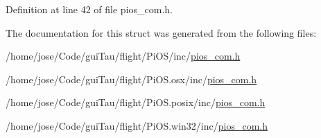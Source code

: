 Definition at line 42 of file pios\-\_\-com.\-h.



The documentation for this struct was generated from the following files\-:\begin{DoxyCompactItemize}
\item 
/home/jose/\-Code/gui\-Tau/flight/\-Pi\-O\-S/inc/\hyperlink{inc_2pios__com_8h}{pios\-\_\-com.\-h}\item 
/home/jose/\-Code/gui\-Tau/flight/\-Pi\-O\-S.\-osx/inc/\hyperlink{osx_2inc_2pios__com_8h}{pios\-\_\-com.\-h}\item 
/home/jose/\-Code/gui\-Tau/flight/\-Pi\-O\-S.\-posix/inc/\hyperlink{posix_2inc_2pios__com_8h}{pios\-\_\-com.\-h}\item 
/home/jose/\-Code/gui\-Tau/flight/\-Pi\-O\-S.\-win32/inc/\hyperlink{win32_2inc_2pios__com_8h}{pios\-\_\-com.\-h}\end{DoxyCompactItemize}
